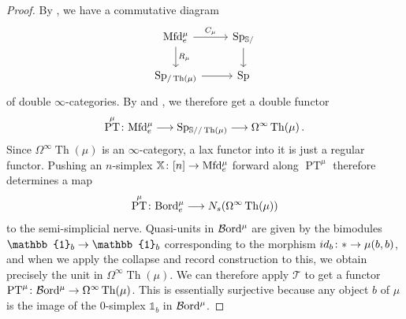 \documentclass[10pt]{amsart}
\numberwithin{equation}{section}
\theoremstyle{definition}
\DeclareMathOperator{\Th}{Th}
\DeclareMathOperator{\PT}{PT}
\newcommand{\Bord}{\mathcal{B}\mathrm{ord}\vphantom{d}}
\newcommand{\PreBord}{\mathrm{Bord}\vphantom{d}}
\newcommand{\Mfd}{\mathrm{Mfd}\vphantom{d}}
\newcommand{\bS}{\mathbb{S}}
\newcommand{\bX}{\mathbb{X}}
\newcommand{\bOne}{\mathbb{1}}
\newcommand{\cT}{\mathcal{T}}
\newcommand{\Sp}{\mathrm{Sp}\vphantom{p}}
\renewcommand{\to}{\mathchoice{\longrightarrow}{\rightarrow}{}{}}
\begin{document}
\begin{proof}
	By , we have a commutative diagram
	\begin{equation*}
		\begin{tikzcd}
			\Mfd_{e}^{\mu} \arrow[r,"C_{\mu}"] \arrow[d, "R_{\mu}"] & \Sp_{\bS/} \arrow[d]\\
			\Sp_{/\Th(\mu)} \arrow[r] & \Sp
		\end{tikzcd}
	\end{equation*}
  of double $\infty$-categories.
	By  and , we therefore get a double functor
	\begin{align*}
		\PT^{\mu}\colon \Mfd_{e}^{\mu} \to \Sp_{\bS//\Th(\mu)} \to \Omega^{\infty} \Th(\mu) \,.
	\end{align*}
	Since $\Omega^{\infty} \Th(\mu)$ is an $\infty$-category, a lax functor into it is just a regular functor.
  Pushing an $n$-simplex $\bX \colon [n] \to \Mfd_{e}^{\mu}$ forward along $\PT^{\mu}$ therefore determines a map
	\begin{align*}
		\PT^{\mu} \colon \PreBord^{\mu}_{e} \to N_{s}(\Omega^{\infty}\Th(\mu))
	\end{align*}
	to the semi-simplicial nerve.
  Quasi-units in $\Bord^{\mu}$ are given by the bimodules $\bOne_{b} \to \bOne_{b}$ corresponding to the morphism $id_{b}\colon \ast \to \mu(b,b)$, and when we apply the collapse and record construction to this, we obtain precisely the unit in $\Omega^{\infty}\Th(\mu)$. We can therefore apply $\cT$ to get a functor $\PT^{\mu}\colon \Bord^{\mu} \to \Omega^{\infty}\Th(\mu)$.
  This is essentially surjective because any object $b$ of $\mu$ is the image of the 0-simplex $\bOne_{b}$ in $\Bord^{\mu}$.


\end{proof}
\end{document}
